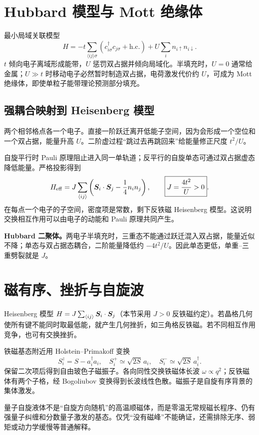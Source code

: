 \section{Hubbard 模型与 Mott 绝缘体}
最小局域关联模型
\[
\boxed{H=-t\sum_{\langle ij\rangle\sigma}
(c_{i\sigma}^\dagger c_{j\sigma}+\mathrm{h.c.})
+U\sum_i n_{i\uparrow}n_{i\downarrow}}.
\]
$t$ 倾向电子离域形成能带，$U$ 惩罚双占据并倾向局域化。半填充时，$U=0$ 通常给金属；$U\gg t$ 时移动电子必然暂时制造双占据，电荷激发代价约 $U$，可成为 Mott 绝缘体，即使单粒子能带理论预测部分填充。

\subsection{强耦合映射到 Heisenberg 模型}
两个相邻格点各一个电子。直接一阶跃迁离开低能子空间，因为会形成一个空位和一个双占据，能量升高 $U$。二阶虚过程“跳过去再跳回来”给能量修正尺度 $t^2/U$。

自旋平行时 Pauli 原理阻止进入同一单轨道；反平行的自旋单态可通过双占据虚态降低能量。严格投影得到
\[
H_{\rm eff}=J\sum_{\langle ij\rangle}
\left(\bm{S}_i\cdot\bm{S}_j-\frac14n_in_j\right),
\qquad\boxed{J=\frac{4t^2}{U}>0}.
\]
在每点一个电子的子空间，密度项是常数，剩下反铁磁 Heisenberg 模型。这说明交换相互作用可以由电子的动能和 Pauli 原理共同产生。

\begin{examplebox}
\textbf{Hubbard 二聚体。}两电子半填充时，三重态不能通过跃迁混入双占据，能量近似不降；单态与双占据态耦合，二阶能量降低约 $-4t^2/U$。因此单态更低，单重--三重劈裂就是 $J$。
\end{examplebox}

\section{磁有序、挫折与自旋波}
Heisenberg 模型
$H=J\sum_{\langle ij\rangle}\bm{S}_i\cdot\bm{S}_j$（本节采用 $J>0$ 反铁磁约定）。若晶格几何使所有键不能同时取最低能，就产生几何挫折，如三角格反铁磁。若不同相互作用竞争，也可有交换挫折。

铁磁基态附近用 Holstein--Primakoff 变换
\[
S_i^z=S-a_i^\dagger a_i,\quad
S_i^+\simeq\sqrt{2S}\,a_i,\quad
S_i^-\simeq\sqrt{2S}\,a_i^\dagger.
\]
保留二次项后得到自由玻色子磁振子。各向同性交换铁磁体长波
$\omega\propto q^2$；反铁磁体有两个子格，经 Bogoliubov 变换得到长波线性色散。磁振子是自旋有序背景的集体激发。

量子自旋液体不是“自旋方向随机”的高温顺磁体，而是零温无常规磁长程序、仍有强量子纠缠和分数量子激发的基态。仅凭“没有磁峰”不能确证，还需排除无序、弱矩或动力学缓慢等普通解释。

